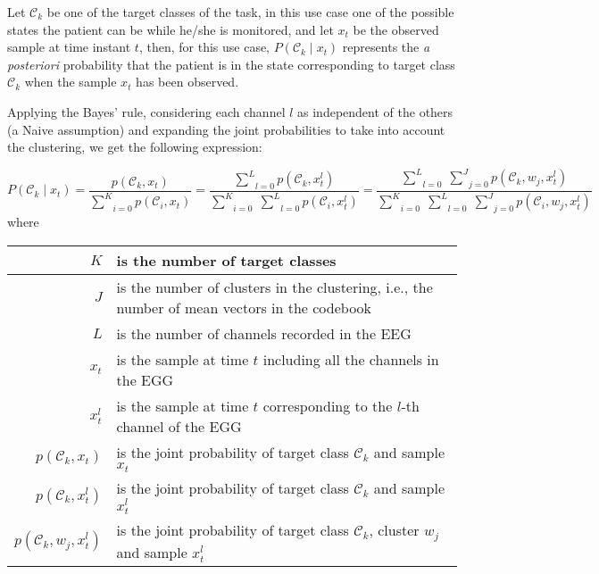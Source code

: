 \documentclass[a4paper,12pt]{article}
\begin{document}
\pagestyle{empty}

Let $\mathcal{C}_{k}$ be one of the target classes of the task, in this use case
one of the possible states the patient can be while he/she is monitored,
and let $x_{t}$ be the observed sample at time instant $t$,
then, for this use case, $P(\mathcal{C}_{k} \mid x_{t})$ represents the
\emph{a posteriori} probability that the patient is in the state corresponding
to target class $\mathcal{C}_{k}$ when the sample $x_{t}$ has been observed.

\bigskip

Applying the Bayes' rule, considering each channel $l$ as independent of the others (a Naive assumption)
and expanding the joint probabilities to take into account the clustering, we get the following 
expression:

\[
    P(\mathcal{C}_{k} \mid x_{t}) = 
    \frac{p(\mathcal{C}_{k}, x_{t})}{\underset{i=0}{\overset{K}{\sum}} p(\mathcal{C}_{i}, x_{t})} =
    \frac{\underset{l=0}{\overset{L}{\sum}} p(\mathcal{C}_{k}, x_{t}^{l})}{\underset{i=0}{\overset{K}{\sum}} \; \underset{l=0}{\overset{L}{\sum}} p(\mathcal{C}_{i}, x_{t}^{l})} =
    \frac{\underset{l=0}{\overset{L}{\sum}} \; \underset{j=0}{\overset{J}{\sum}} p(\mathcal{C}_{k}, w_{j}, x_{t}^{l})}{\underset{i=0}{\overset{K}{\sum}} \; \underset{l=0}{\overset{L}{\sum}} \; \underset{j=0}{\overset{J}{\sum}} p(\mathcal{C}_{i}, w_{j}, x_{t}^{l})}
\]
where
\begin{center}
\begin{tabular}{|r|p{100mm}|}
\hline
$K$ & is the number of target classes \\
\hline
$J$ & is the number of clusters in the clustering, i.e., the number of mean vectors in the codebook \\
\hline
$L$ & is the number of channels recorded in the EEG \\
\hline
$x_{t}$ & is the sample at time $t$ including all the channels in the EGG \\
\hline
$x_{t}^{l}$ & is the sample at time $t$ corresponding to the $l$-th channel of the EGG \\
\hline
$p(\mathcal{C}_{k}, x_{t})$ & is the joint probability of target class $\mathcal{C}_{k}$ and sample $x_{t}$ \\
\hline
$p(\mathcal{C}_{k}, x_{t}^{l})$ & is the joint probability of target class $\mathcal{C}_{k}$ and sample $x_{t}^{l}$ \\
\hline
$p(\mathcal{C}_{k}, w_{j}, x_{t}^{l})$ & is the joint probability of target class $\mathcal{C}_{k}$, cluster $w_{j}$ and sample $x_{t}^{l}$ \\
\hline
\end{tabular}
\end{center}
\end{document}
